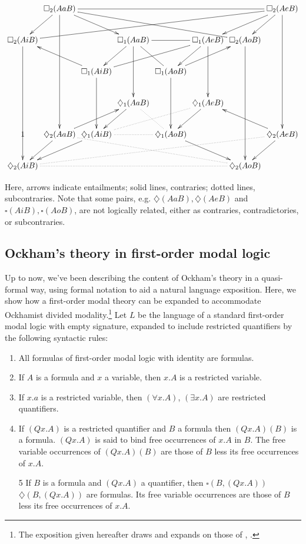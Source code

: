 \documentclass[a4paper]{article}
\begin{document}
\begin{displaymath}
\xymatrix@C=.1em{
	 & \square_{2}(AaB) \ar[dddd] \ar[drr] \ar [dl] \ar@{-}[rrrrrr] \ar@{-}[drrrrr] &  &  &  &  &  & \square_{2}(AeB) \ar[dddd] \ar[dl] \ar[dll]\\
	\square_{2}(AiB) \ar[dddd] \ar@{-}[urrrrrrr] &  &  & \square_{1}(AaB) \ar[dd] \ar[dl] \ar@{-}[rr] \ar@{-}[dr]
	 &  & \square_{1}(AeB) \ar[dd] \ar[dl] \ar@{-}[dlll] & \square_{2}(AoB) \ar[dddd] &  \\
	 &  & \square_{1}(AiB) \ar[dd] \ar[ull] &  & \square_{1}(AoB) \ar[dd] \ar[urr] &  &  &  \\
	 &  &  & \diamondsuit_{1}(AaB) \ar[dl] \ar@{.}[dr] &  & \diamondsuit_{1}(AeB) \ar[dl] &  &  \\ 
	 1 & \diamondsuit_{2}(AaB) \ar[dl] \ar[urr] \ar@{.}[drrrrr] & \diamondsuit_{1}(AiB) \ar[dll] \ar@{.}[rr] \ar@{.}[rrru]& & \diamondsuit_{1}(AoB) \ar[drr] &  &  & \diamondsuit_{2}(AeB) \ar[ull] \ar[dl] \\
	\diamondsuit_{2}(AiB) \ar@{.}[rrrrrr] \ar@{.}[rrrrrrru] &  &  &  &  &  & \diamondsuit_{2}(AoB) & }
\end{displaymath}

Here, arrows indicate entailments; solid lines, contraries; dotted lines, subcontraries. Note that some pairs, e.g. $\diamondsuit(AaB), \diamondsuit(AeB)$ and $\square(AiB), \square(AoB)$, are not logically related, either as contraries, contradictories, or subcontraries.

\subsection{Ockham's theory in first-order modal logic}
Up to now, we've been describing the content of Ockham's theory in a quasi-formal way, using formal notation to aid a natural language exposition. Here, we show how a first-order modal theory can be expanded to accommodate Ockhamist divided modality.\footnote{The exposition given hereafter draws and expands on those of \cite{Klima1988}, \cite{Klima2001}.} Let $L$ be the language of a standard first-order modal logic with empty signature, expanded to include restricted quantifiers by the following syntactic rules: 
\begin{enumerate}
	\item All formulas of first-order modal logic with identity are formulas.
	\item If $A$ is a formula and $x$ a variable, then $x.A$ is a restricted variable. 
	\item If $x.a$ is a restricted variable, then $(\forall x.A)$, $(\exists x.A)$ are restricted quantifiers. 
	\item If $(Qx.A)$ is a restricted quantifier and $B$ a formula then $(Qx.A)(B)$ is a formula. $(Qx.A)$ is said to bind free occurrences of $x.A$ in $B$. The free variable occurrences of $(Qx.A)(B)$ are those of $B$ less its free occurrences of $x.A$.
	\item[5] If $B$ is a formula and $(Qx.A)$ a quantifier, then $\square(B, (Qx.A))$ $\diamondsuit(B, (Qx.A))$ are formulas. Its free variable occurrences are those of $B$ less its free occurrences of $x.A$.
	\end{enumerate}
	
\end{document}
